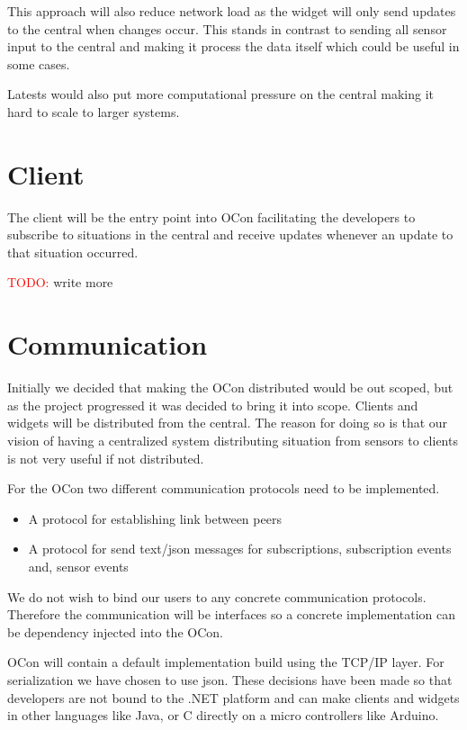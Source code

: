 \documentclass[]{report}
\newcommand\todo[1]{\textcolor{red}{TODO: }#1\PackageWarning{TODO:}{TODO tag!!}}
\begin{document}
This approach will also reduce network load as the widget will only send updates to the central when changes occur. This stands in contrast to sending all sensor input to the central and making it process the data itself which could be useful in some cases.

Latests would also put more computational pressure on the central making it hard to scale to larger systems.


\section{Client}

The client will be the entry point into OCon facilitating the developers to subscribe to situations in the central and receive updates whenever an update to that situation occurred. 

\todo write more


\section{Communication}

Initially we decided that making the OCon distributed would be out scoped, but as the project progressed it was decided to bring it into scope. Clients and widgets will be distributed from the central. The reason for doing so is that our vision of having a centralized system distributing situation from sensors to clients is not very useful if not distributed.

For the OCon two different communication protocols need to be implemented.\\

\begin{itemize}
	\item A protocol for establishing link between peers
	\item A protocol for send text/json messages for subscriptions, subscription events and, sensor events \\
\end{itemize}

We do not wish to bind our users to any concrete communication protocols. Therefore the communication will be interfaces so a concrete implementation can be dependency injected into the OCon.

OCon will contain a default implementation build using the TCP/IP layer. For serialization we have chosen to use json. These decisions have been made so that developers are not bound to the .NET platform and can make clients and widgets in other languages like Java, or C directly on a micro controllers like Arduino.
\end{document}

